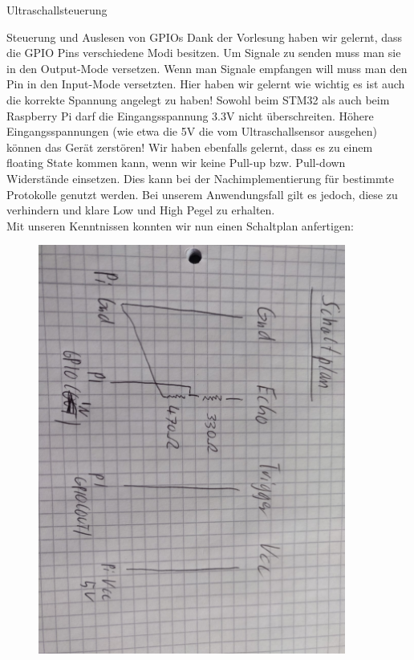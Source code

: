 \documentclass[12pt]{report}
\begin{document}
\begin{section}{Ultraschallsteuerung}
    \begin{subsection}{Steuerung und Auslesen von GPIOs}
        Dank der Vorlesung haben wir gelernt, dass die GPIO Pins verschiedene
        Modi besitzen. Um Signale zu senden muss man sie in den Output-Mode 
        versetzen. Wenn man Signale empfangen will muss man den Pin in
        den Input-Mode versetzten. Hier haben wir gelernt wie wichtig es ist 
        auch die korrekte Spannung angelegt zu haben! Sowohl beim STM32 als auch
        beim Raspberry Pi darf die Eingangsspannung 3.3V nicht überschreiten.
        Höhere Eingangsspannungen (wie etwa die 5V die vom Ultraschallsensor 
        ausgehen) können das Gerät zerstören! Wir haben ebenfalls gelernt, 
        dass es zu einem floating State kommen kann, wenn wir keine Pull-up 
        bzw. Pull-down Widerstände einsetzen. Dies kann bei der 
        Nachimplementierung für bestimmte Protokolle genutzt werden. Bei unserem
        Anwendungsfall gilt es jedoch, diese zu verhindern und klare Low und High
        Pegel zu erhalten.\\
        Mit unseren Kenntnissen konnten wir nun einen Schaltplan anfertigen:
        \begin{figure}[H]
        \centering
            \begin{minipage}{0.45\textwidth}
                \centering
                \includegraphics[width=0.9\textwidth]{lernportfolio_assets/Schaltplan_Ultraschallsensor1}

\end{minipage}
\end{figure}
\end{subsection}
\end{section}
\end{document}
